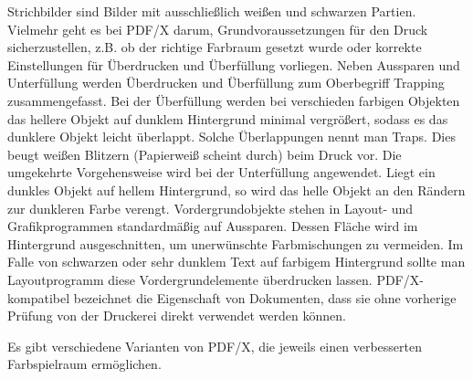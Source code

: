 Strichbilder sind Bilder mit ausschließlich weißen und schwarzen Partien. \cite{strich} Vielmehr geht es bei PDF/X darum, Grundvoraussetzungen für den Druck sicherzustellen, z.B. ob der richtige Farbraum gesetzt wurde oder korrekte Einstellungen für Überdrucken und Überfüllung vorliegen. Neben Aussparen und Unterfüllung werden Überdrucken und Überfüllung zum Oberbegriff Trapping zusammengefasst. Bei der Überfüllung werden bei verschieden farbigen Objekten das hellere Objekt auf dunklem Hintergrund minimal vergrößert, sodass es das dunklere Objekt leicht überlappt. Solche Überlappungen nennt man Traps. Dies beugt weißen Blitzern (Papierweiß scheint durch) beim Druck vor. Die umgekehrte Vorgehensweise wird bei der Unterfüllung angewendet. Liegt ein dunkles Objekt auf hellem Hintergrund, so wird das helle Objekt an den Rändern zur dunkleren Farbe verengt. Vordergrundobjekte stehen in Layout- und Grafikprogrammen standardmäßig auf Aussparen. Dessen Fläche wird im Hintergrund ausgeschnitten, um unerwünschte Farbmischungen zu vermeiden. Im Falle von schwarzen oder sehr dunklem Text auf farbigem Hintergrund sollte man Layoutprogramm diese Vordergrundelemente überdrucken lassen. \cite{kompendium} PDF/X-kompatibel bezeichnet die Eigenschaft von Dokumenten, dass sie ohne vorherige Prüfung von der Druckerei direkt verwendet werden können. \cite{adobe-pdf-x}
\par
Es gibt verschiedene Varianten von PDF/X, die jeweils einen verbesserten Farbspielraum ermöglichen. 

